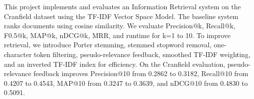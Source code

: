 This project implements and evaluates an Information Retrieval system on the 
Cranfield dataset using the TF-IDF Vector Space Model. The baseline system ranks documents using cosine similarity.
We evaluate Precision@k, Recall@k, F0.5@k, MAP@k, nDCG@k, MRR, and runtime for k=1 to 10. 
To improve retrieval, we introduce Porter stemming, stemmed stopword removal, one-character token filtering, 
pseudo-relevance feedback, smoothed TF-IDF weighting, and an inverted TF-IDF index for efficiency. 
On the Cranfield evaluation, pseudo-relevance feedback improves Precision@10 from 0.2862 to 0.3182, 
Recall@10 from 0.4207 to 0.4543, MAP@10 from 0.3247 to 0.3639, and nDCG@10 from 0.4830 to 0.5091.
